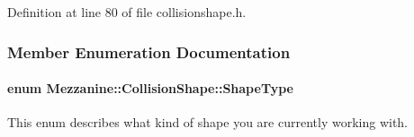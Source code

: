 Definition at line 80 of file collisionshape.h.



\subsubsection{Member Enumeration Documentation}
\hypertarget{classMezzanine_1_1CollisionShape_ad04186055565998879b64176d6dd100d}{
\paragraph[{ShapeType}]{\setlength{\rightskip}{0pt plus 5cm}enum {\bf Mezzanine::CollisionShape::ShapeType}}\hfill}
\label{classMezzanine_1_1CollisionShape_ad04186055565998879b64176d6dd100d}


This enum describes what kind of shape you are currently working with. 

